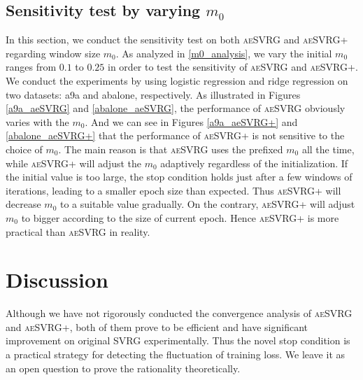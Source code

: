 \documentclass[conference]{IEEEtran}
\begin{document}
\subsection{Sensitivity test by varying  $m_0$}
In this section, we conduct the sensitivity test on both \textsc{aeSVRG} and \textsc{aeSVRG+} regarding window size $m_0$. As analyzed in \ref{m0_analysis}, we vary the initial $m_0$ ranges from $0.1$ to $0.25$ in order to test the sensitivity of \textsc{aeSVRG} and \textsc{aeSVRG+}. We conduct the experiments by using logistic regression and ridge regression on two datasets: a9a and abalone, respectively. As illustrated in Figures \ref{a9a_aeSVRG} and \ref{abalone_aeSVRG}, the performance of \textsc{aeSVRG} obviously varies with the $m_0$. And we can see in Figures \ref{a9a_aeSVRG+} and \ref{abalone_aeSVRG+} that the performance of \textsc{aeSVRG+} is not sensitive to the choice of $m_0$. 
The main reason is that \textsc{aeSVRG} uses the prefixed $m_0$ all the time, while \textsc{aeSVRG+} will adjust the $m_0$ adaptively regardless of the initialization.
If the initial value is too large, the stop condition holds just after a few windows of iterations, leading to a smaller epoch size than expected.
Thus \textsc{aeSVRG+} will decrease $m_0$ to a suitable value gradually. On the contrary, \textsc{aeSVRG+} will adjust $m_0$ to bigger according to the size of current epoch.  
Hence \textsc{aeSVRG+} is more practical than \textsc{aeSVRG} in reality.

\section{Discussion}
\label{discussion}

Although we have not rigorously conducted the convergence analysis of \textsc{aeSVRG} and \textsc{aeSVRG+}, both of them prove to be efficient and have significant improvement on original SVRG experimentally. Thus the novel stop condition is a practical strategy for detecting the fluctuation of training loss. We leave it as an open question to prove the rationality theoretically.
\end{document}
